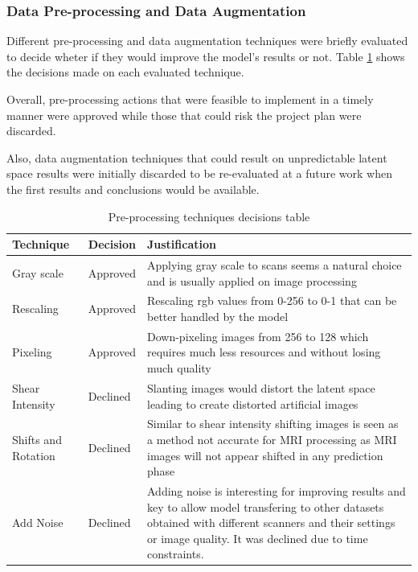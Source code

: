 \subsubsection*{Data Pre-processing and Data Augmentation}

Different pre-processing and data augmentation techniques were briefly evaluated to decide wheter if they would improve the model's results or not. Table \ref{table:preprocessing} shows the decisions made on each evaluated technique.

Overall, pre-processing actions that were feasible to implement in a timely manner were approved while those that could risk the project plan were discarded.

Also, data augmentation techniques that could result on unpredictable latent space results were initially discarded to be re-evaluated at a future work when the first results and conclusions would be available.

\begin{table}
    \centering
    \begin{tabular}{p{3cm}|p{2cm}|p{6cm}}
        \hline
        Technique & Decision & Justification \\
        \hline
        Gray scale & Approved & Applying gray scale to scans seems a natural choice and is usually applied on image processing \\
        Rescaling & Approved & Rescaling \acrshort{rgb} values from 0-256 to 0-1 that can be better handled by the model  \\
        Pixeling & Approved & Down-pixeling images from 256 to 128 which requires much less resources and without losing much quality \\
        Shear Intensity & Declined & Slanting images would distort the latent space leading to create distorted artificial images \\
        Shifts and Rotation & Declined & Similar to shear intensity shifting images is seen as a method not accurate for MRI processing as MRI images will not appear shifted in any prediction phase \\
        Add Noise & Declined & Adding noise is interesting for improving results and key to allow model transfering to other datasets obtained with different scanners and their settings or image quality. It was declined due to time constraints. \\
        \hline
    \end{tabular}
    \caption{Pre-processing techniques decisions table}
    \label{table:preprocessing}
\end{table}

